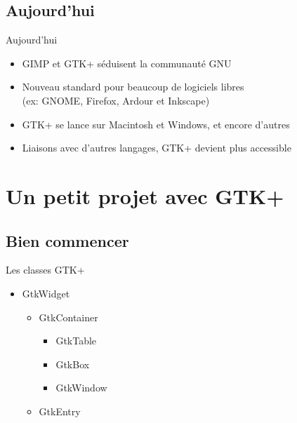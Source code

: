 \documentclass{beamer}
\begin{document}
  \subsection{Aujourd'hui}
  \begin{frame}{Aujourd'hui}
  \begin{itemize}
    \item GIMP et GTK+ séduisent la communauté GNU\\
    \item Nouveau standard pour beaucoup de logiciels libres\\(ex: GNOME, Firefox, Ardour et Inkscape)\\
    \item GTK+ se lance sur Macintosh et Windows, et encore d'autres\\
    \item Liaisons avec d'autres langages, GTK+ devient plus accessible
    \end{itemize}
  \end{frame}

  \section{Un petit projet avec GTK+}
  \subsection{Bien commencer}
  \begin{frame}{Les classes GTK+}
  \begin{itemize}
  \item GtkWidget\\
  \begin{itemize}
  \item GtkContainer\\
  \begin{itemize}
  \item	GtkTable\\
  \item	GtkBox\\
  \item GtkWindow\\
  \end{itemize}
  \item GtkEntry\\
  \end{itemize}
  \end{itemize}
  \end{frame}
\end{document}
